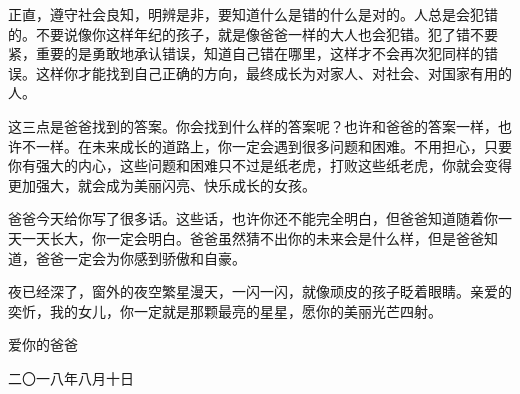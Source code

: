 正直，遵守社会良知，明辨是非，要知道什么是错的什么是对的。人总是会犯错的。不要说像你这样年纪的孩子，就是像爸爸一样的大人也会犯错。犯了错不要紧，重要的是勇敢地承认错误，知道自己错在哪里，这样才不会再次犯同样的错误。这样你才能找到自己正确的方向，最终成长为对家人、对社会、对国家有用的人。

这三点是爸爸找到的答案。你会找到什么样的答案呢？也许和爸爸的答案一样，也许不一样。在未来成长的道路上，你一定会遇到很多问题和困难。不用担心，只要你有强大的内心，这些问题和困难只不过是纸老虎，打败这些纸老虎，你就会变得更加强大，就会成为美丽闪亮、快乐成长的女孩。

爸爸今天给你写了很多话。这些话，也许你还不能完全明白，但爸爸知道随着你一天一天长大，你一定会明白。爸爸虽然猜不出你的未来会是什么样，但是爸爸知道，爸爸一定会为你感到骄傲和自豪。

夜已经深了，窗外的夜空繁星漫天，一闪一闪，就像顽皮的孩子眨着眼睛。亲爱的奕忻，我的女儿，你一定就是那颗最亮的星星，愿你的美丽光芒四射。

\mbox{}

\leftskip=60mm 爱你的爸爸

\leftskip=53mm 二〇一八年八月十日